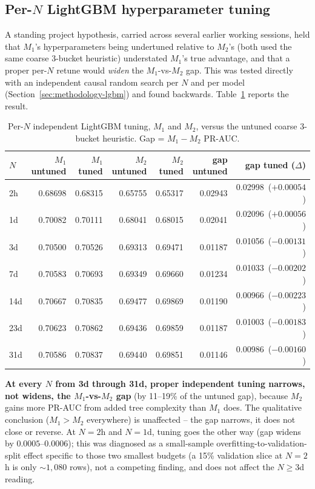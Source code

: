 \subsection{Per-$N$ LightGBM hyperparameter tuning}
\label{sec:results-tuning}

A standing project hypothesis, carried across several earlier working
sessions, held that $M_1$'s hyperparameters being undertuned relative to
$M_2$'s (both used the same coarse 3-bucket heuristic) understated $M_1$'s
true advantage, and that a proper per-$N$ retune would \emph{widen} the
$M_1$-vs-$M_2$ gap. This was tested directly with an independent causal
random search per $N$ and per model (Section~\ref{sec:methodology-lgbm})
and found backwards. Table~\ref{tab:per-n-tuning} reports the result.

\begin{table}[htbp]
\centering
\caption{Per-$N$ independent LightGBM tuning, $M_1$ and $M_2$, versus the
untuned coarse 3-bucket heuristic. Gap = $M_1 - M_2$ PR-AUC.}
\label{tab:per-n-tuning}
\begin{tabular}{@{}lrrrrrr@{}}
\toprule
$N$ & $M_1$ untuned & $M_1$ tuned & $M_2$ untuned & $M_2$ tuned & gap untuned & gap tuned ($\Delta$) \\
\midrule
2h  & 0.68698 & 0.68315 & 0.65755 & 0.65317 & 0.02943 & 0.02998\ ($+0.00054$) \\
1d  & 0.70082 & 0.70111 & 0.68041 & 0.68015 & 0.02041 & 0.02096\ ($+0.00056$) \\
3d  & 0.70500 & 0.70526 & 0.69313 & 0.69471 & 0.01187 & 0.01056\ ($-0.00131$) \\
7d  & 0.70583 & 0.70693 & 0.69349 & 0.69660 & 0.01234 & 0.01033\ ($-0.00202$) \\
14d & 0.70667 & 0.70835 & 0.69477 & 0.69869 & 0.01190 & 0.00966\ ($-0.00223$) \\
23d & 0.70623 & 0.70862 & 0.69436 & 0.69859 & 0.01187 & 0.01003\ ($-0.00183$) \\
31d & 0.70586 & 0.70837 & 0.69440 & 0.69851 & 0.01146 & 0.00986\ ($-0.00160$) \\
\bottomrule
\end{tabular}
\end{table}

\textbf{At every $N$ from 3d through 31d, proper independent tuning
narrows, not widens, the $M_1$-vs-$M_2$ gap} (by 11--19\% of the untuned
gap), because $M_2$ gains more PR-AUC from added tree complexity than
$M_1$ does. The qualitative conclusion ($M_1 > M_2$ everywhere) is
unaffected -- the gap narrows, it does not close or reverse. At $N=2$h
and $N=1$d, tuning goes the other way (gap widens by $0.0005$--$0.0006$);
this was diagnosed as a small-sample overfitting-to-validation-split
effect specific to those two smallest budgets (a 15\% validation slice
at $N=2$h is only $\sim 1{,}080$ rows), not a competing finding, and does
not affect the $N \ge 3$d reading.

